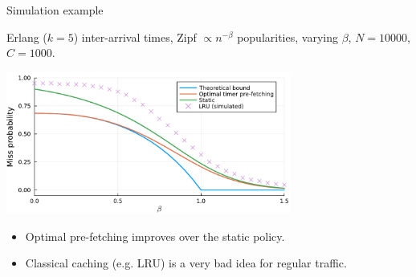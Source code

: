 \documentclass[aspectratio=169]{beamer}
\begin{document}
\begin{frame}{Simulation example}
	
	Erlang ($k=5$) inter-arrival times, Zipf $\propto n^{-\beta}$ popularities, varying $\beta$, $N=10000$, $C=1000$.

\begin{center}
\includegraphics[width=0.7\textwidth]{figuras/comparison.pdf}
\end{center}

\vfill
\begin{itemize}
\item Optimal pre-fetching improves over the static policy.
\item Classical caching (e.g. LRU) is a very bad idea for regular traffic.
\end{itemize}
\end{frame}
\end{document}
